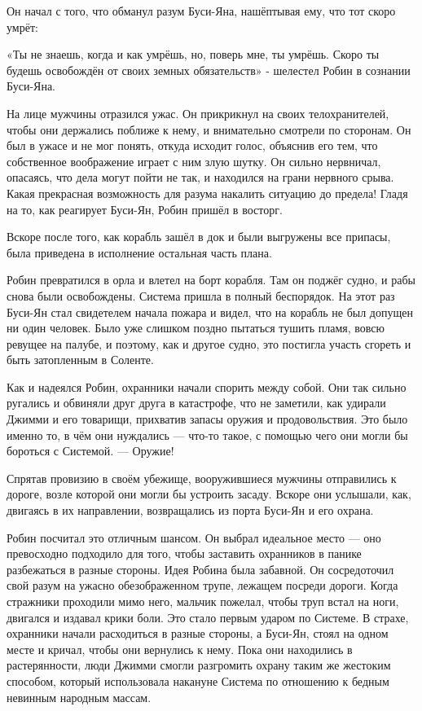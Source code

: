 \documentclass[a4paper,12pt]{book}
\begin{document}
Он начал с того, что обманул разум Буси-Яна, нашёптывая ему, что тот скоро умрёт:
\par
«Ты не знаешь, когда и как умрёшь, но, поверь мне, ты умрёшь. Скоро ты будешь освобождён от своих земных обязательств» - шелестел Робин в сознании Буси-Яна.
\par
На лице мужчины отразился ужас. Он прикрикнул на своих телохранителей, чтобы они держались поближе к нему, и внимательно смотрели по сторонам. Он был в ужасе и не мог понять, откуда исходит голос, объяснив его тем, что собственное воображение играет с ним злую шутку. Он сильно нервничал, опасаясь, что дела могут пойти не так, и находился на грани нервного срыва. Какая прекрасная возможность для разума накалить ситуацию до предела! Гладя на то, как реагирует Буси-Ян, Робин пришёл в восторг.
\par
Вскоре после того, как корабль зашёл в док и были выгружены все припасы, была приведена в исполнение остальная часть плана.\\
\par
Робин превратился в орла и влетел на борт корабля. Там он поджёг судно, и рабы снова были освобождены. Система пришла в полный беспорядок. На этот раз Буси-Ян стал свидетелем начала пожара и видел, что на корабль не был допущен ни один человек. Было уже слишком поздно пытаться тушить пламя, вовсю ревущее на палубе, и поэтому, как и другое судно, это постигла участь сгореть и быть затопленным в Соленте.
\par
Как и надеялся Робин, охранники начали спорить между собой. Они так сильно ругались и обвиняли друг друга в катастрофе, что не заметили, как удирали Джимми и его товарищи, прихватив запасы оружия и продовольствия. Это было именно то, в чём они нуждались — что-то такое, с помощью чего они могли бы бороться с Системой.  — Оружие!
\par
Спрятав провизию в своём убежище, вооружившиеся мужчины отправились к дороге, возле которой они могли бы устроить засаду. Вскоре они услышали, как, двигаясь в их направлении, возвращались из порта Буси-Ян и его охрана.\\
\par
Робин посчитал это отличным шансом. Он выбрал идеальное место — оно превосходно подходило для того, чтобы заставить охранников в панике разбежаться в разные стороны. Идея Робина была забавной. Он сосредоточил свой разум на ужасно обезображенном трупе, лежащем посреди дороги. Когда стражники проходили мимо него, мальчик пожелал, чтобы труп встал на ноги, двигался и издавал крики боли. Это стало первым ударом по Системе. В страхе, охранники начали расходиться в разные стороны, а Буси-Ян, стоял на одном месте и кричал, чтобы они вернулись к нему. Пока они находились в растерянности, люди Джимми смогли разгромить охрану таким же жестоким способом, который использовала накануне Система по отношению к бедным невинным народным массам.
\end{document}
